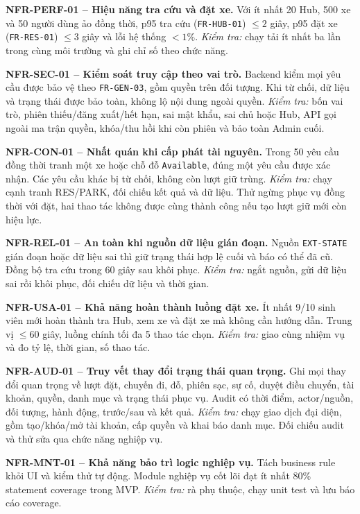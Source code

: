 \noindent\textbf{NFR-PERF-01 -- Hiệu năng tra cứu và đặt xe.} Với ít nhất 20 Hub, 500 xe và 50 người dùng ảo đồng thời, p95 tra cứu (\texttt{FR-HUB-01}) $\leq2$ giây, p95 đặt xe (\texttt{FR-RES-01}) $\leq3$ giây và lỗi hệ thống $<1\%$. \textit{Kiểm tra:} chạy tải ít nhất ba lần trong cùng môi trường và ghi chỉ số theo chức năng.

\medskip
\noindent\textbf{NFR-SEC-01 -- Kiểm soát truy cập theo vai trò.} Backend kiểm mọi yêu cầu được bảo vệ theo \texttt{FR-GEN-03}, gồm quyền trên đối tượng. Khi từ chối, dữ liệu và trạng thái được bảo toàn, không lộ nội dung ngoài quyền. \textit{Kiểm tra:} bốn vai trò, phiên thiếu/đăng xuất/hết hạn, sai mật khẩu, sai chủ hoặc Hub, API gọi ngoài ma trận quyền, khóa/thu hồi khi còn phiên và bảo toàn Admin cuối.

\medskip
\noindent\textbf{NFR-CON-01 -- Nhất quán khi cấp phát tài nguyên.} Trong 50 yêu cầu đồng thời tranh một xe hoặc chỗ đỗ \texttt{Available}, đúng một yêu cầu được xác nhận. Các yêu cầu khác bị từ chối, không còn lượt giữ trùng. \textit{Kiểm tra:} chạy cạnh tranh RES/PARK, đối chiếu kết quả và dữ liệu. Thử ngừng phục vụ đồng thời với đặt, hai thao tác không được cùng thành công nếu tạo lượt giữ mới còn hiệu lực.

\medskip
\noindent\textbf{NFR-REL-01 -- An toàn khi nguồn dữ liệu gián đoạn.} Nguồn \texttt{EXT-STATE} gián đoạn hoặc dữ liệu sai thì giữ trạng thái hợp lệ cuối và báo có thể đã cũ. Đồng bộ tra cứu trong 60 giây sau khôi phục. \textit{Kiểm tra:} ngắt nguồn, gửi dữ liệu sai rồi khôi phục, đối chiếu dữ liệu và thời gian.

\medskip
\noindent\textbf{NFR-USA-01 -- Khả năng hoàn thành luồng đặt xe.} Ít nhất 9/10 sinh viên mới hoàn thành tra Hub, xem xe và đặt xe mà không cần hướng dẫn. Trung vị $\leq60$ giây, luồng chính tối đa 5 thao tác chọn. \textit{Kiểm tra:} giao cùng nhiệm vụ và đo tỷ lệ, thời gian, số thao tác.

\medskip
\noindent\textbf{NFR-AUD-01 -- Truy vết thay đổi trạng thái quan trọng.} Ghi mọi thay đổi quan trọng về lượt đặt, chuyến đi, đỗ, phiên sạc, sự cố, duyệt điều chuyển, tài khoản, quyền, danh mục và trạng thái phục vụ. Audit có thời điểm, actor/nguồn, đối tượng, hành động, trước/sau và kết quả. \textit{Kiểm tra:} chạy giao dịch đại diện, gồm tạo/khóa/mở tài khoản, cấp quyền và khai báo danh mục. Đối chiếu audit và thử sửa qua chức năng nghiệp vụ.

\medskip
\noindent\textbf{NFR-MNT-01 -- Khả năng bảo trì logic nghiệp vụ.} Tách business rule khỏi UI và kiểm thử tự động. Module nghiệp vụ cốt lõi đạt ít nhất 80\% statement coverage trong MVP. \textit{Kiểm tra:} rà phụ thuộc, chạy unit test và lưu báo cáo coverage.
\par
